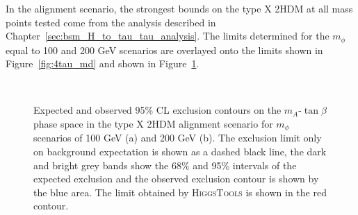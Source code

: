 In the alignment scenario, the strongest bounds on the type X \ac{2HDM} at all mass points tested come from the analysis described in Chapter~\ref{sec:bsm_H_to_tau_tau_analysis}.
The limits determined for the $m_{\phi}$ equal to 100 and 200 GeV scenarios are overlayed onto the limits shown in Figure~\ref{fig:4tau_md} and shown in Figure~\ref{fig:4tau_md_hb}. \\

\begin{figure}[!hbtp]
\centering
     \\
\caption{Expected and observed 95\% CL exclusion contours on the $m_{A}$-$\tan\beta$ phase space in the type X 2HDM alignment scenario for $m_{\phi}$ scenarios of 100 GeV (a) and 200 GeV (b). The exclusion limit only on background expectation is shown as a dashed black line, the dark and bright grey bands show the 68\% and 95\% intervals of the expected exclusion and the observed exclusion contour is shown by the blue area. The limit obtained by \textsc{HiggsTools} is shown in the red contour.}
\label{fig:4tau_md_hb}
\end{figure}

